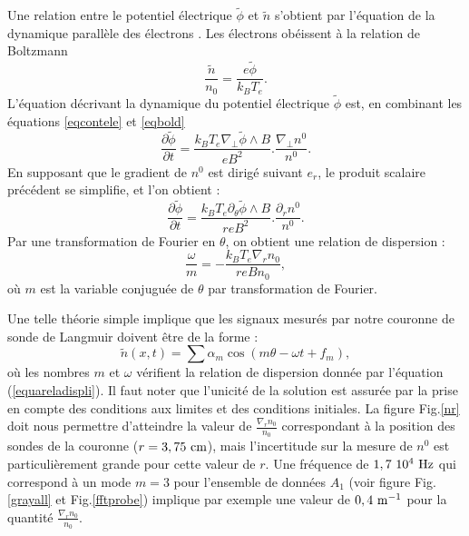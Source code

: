 \documentclass{book}
\begin{document}
Une relation entre le potentiel 
\'electrique $\tilde{\phi}$ et
$\tilde{n}$ s'obtient par 
l'\'equation de la dynamique parall\`ele des \'electrons \cite{Chen84}. 
Les \'electrons ob\'eissent
\`a la relation de Boltzmann
\begin{equation}\label{eqbold}
\frac{\tilde{n}}{n_0}=\frac{e\tilde{\phi}}{k_B T_e}.
\end{equation}
L'\'equation d\'ecrivant la dynamique du potentiel \'electrique
$\tilde{\phi}$ est, en combinant les \'equations \ref{eqcontele} et
\ref{eqbold} 
\begin{equation}
\frac{\partial \tilde{\phi}}{\partial
t}=\frac{k_B T_e\nabla_\perp\tilde\phi\wedge B}{e
B^2}.\frac{\nabla_\perp n^0}{n^0}. 
\end{equation}
En supposant que le gradient de $n^0$ est dirig\'e suivant $e_r$, le
produit scalaire pr\'ec\'edent se simplifie, et l'on obtient :
\begin{equation}
\frac{\partial \tilde{\phi}}{\partial
t}=\frac{k_B T_e\partial_\theta\tilde\phi\wedge
B}{r e B^2}.\frac{\partial_r n^0}{n^0}.
\end{equation}
Par une transformation de Fourier en $\theta$, on obtient une relation
de dispersion :
\begin{equation}\label{equareladispli}
\frac{\omega}{m}=-\frac{k_B T_e\nabla_r n_0}{r e B n_0},
\end{equation}
o\`u $m$ est la variable conjugu\'ee de $\theta$ par transformation de
Fourier. 

Une telle th\'eorie simple implique que les signaux mesur\'es par
notre couronne de sonde de Langmuir doivent \^etre de la forme :
\begin{equation}\label{equsimplesuper}
\tilde n(x,t)=\sum \alpha_m \cos(m \theta-\omega t+f_m),
\end{equation}
o\`u les nombres $m$ et $\omega$ v\'erifient la relation de dispersion
donn\'ee par l'\'equation (\ref{equareladispli}). Il faut noter que
l'unicit\'e de la solution est assur\'ee par la prise en compte des
conditions aux limites et des conditions initiales. 
La figure Fig.\ref{nr} doit nous permettre d'atteindre la valeur de
$\frac{\nabla_r n_0}{n_0}$ correspondant \`a la position des sondes de
la couronne ($r=3,75\ {\rm cm}$), mais l'incertitude sur la mesure de
$n^0$ est particuli\`erement grande pour cette valeur de $r$. Une
fr\'equence de $1,7\ 10^{4}\ {\rm Hz}$ qui correspond \`a un mode
$m=3$ pour l'ensemble de donn\'ees $A_1$ (voir figure
Fig.\ref{grayall} et 
Fig.\ref{fftprobe}) implique par exemple une valeur de $0,4\ {\rm
m}^{-1}$ pour la quantit\'e $\frac{\nabla_r n_0}{n_0}$.
\end{document}
